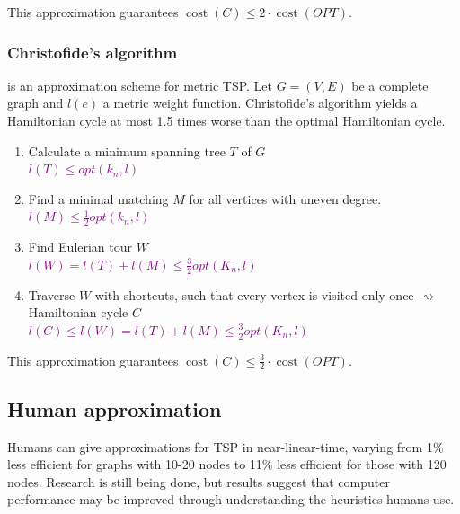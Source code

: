 \documentclass[a3paper, landscape, 11pt]{article} %
\begin{document}
\begin{multicols*}{4}
This approximation guarantees $\operatorname{cost}(C)\le 2 \cdot \operatorname{cost}(OPT)$.

\subsubsection*{Christofide's algorithm}
 is an approximation scheme for metric TSP. Let $G=(V,E)$ be a complete graph and $l(e)$ a metric weight function. Christofide's algorithm yields a Hamiltonian cycle at most 1.5 times worse than the optimal Hamiltonian cycle.

\begin{enumerate}[noitemsep]
	\item Calculate a minimum spanning tree $T$ of $G$\\
	\textcolor{purple}{\small{\hspace{15pt}$l(T) \le opt(k_n, l)$}}
	\item Find a minimal matching $M$ for all vertices with uneven degree.\\
	\textcolor{purple}{\small{\hspace{15pt}$l(M) \le \frac{1}{2} opt(k_n, l)$}}
	\item{Find Eulerian tour $W$}\\
	\textcolor{purple}{\small{\hspace{15pt}$l(W) = l(T) + l(M) \le \frac{3}{2} opt(K_n,l)$}}
	\item Traverse $W$ with shortcuts, such that every vertex is visited only once $\rightsquigarrow$ Hamiltonian cycle $C$\\
	\textcolor{purple}{\small{\hspace{15pt}$l(C) \le l(W) = l(T) + l(M) \le \frac{3}{2} opt(K_n,l)$}}
\end{enumerate}

This approximation guarantees $\operatorname{cost}(C)\le \frac{3}{2} \cdot \operatorname{cost}(OPT)$.

\subsection*{Human approximation}
Humans can give approximations for TSP in near-linear-time, varying from 1\% less efficient for graphs with 10-20 nodes to 11\% less efficient for those with 120 nodes. Research is still being done, but results suggest that computer performance may be improved through understanding the heuristics humans use.

\vfill %





\end{multicols*}
\end{document}
